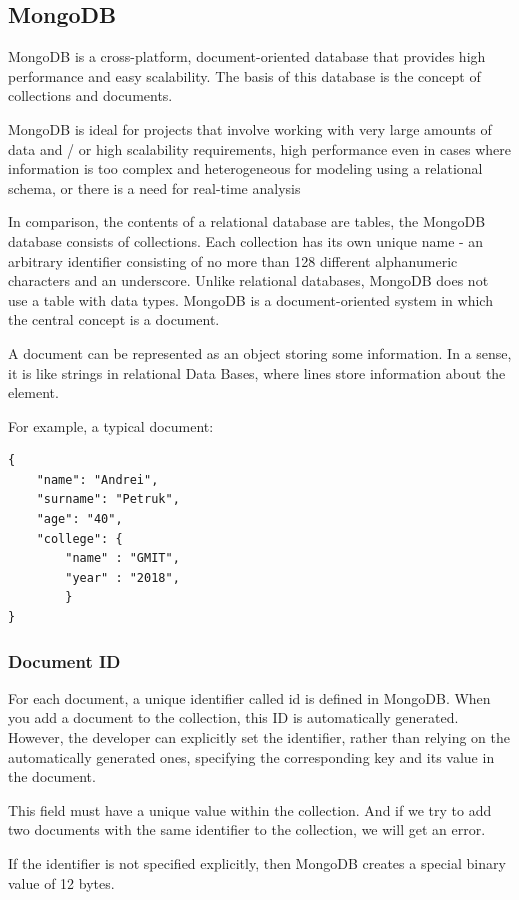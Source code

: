 \subsection{MongoDB}
MongoDB is a cross-platform, document-oriented database that provides high performance and easy scalability. The basis of this database is the concept of collections and documents.\par
MongoDB is ideal for projects that involve working with very large amounts of data and / or high scalability requirements, high performance even in cases where information is too complex and heterogeneous for modeling using a relational schema, or there is a need for real-time analysis \par
In comparison, the contents of a relational database are tables, the MongoDB database consists of collections. Each collection has its own unique name - an arbitrary identifier consisting of no more than 128 different alphanumeric characters and an underscore.
Unlike relational databases, MongoDB does not use a table with data types. MongoDB is a document-oriented system in which the central concept is a document. \par
A document can be represented as an object storing some information. In a sense, it is like strings in relational Data Bases, where lines store information about the element. \cite{MongoDB} \par For example, a typical document:

\begin{verbatim}
{
    "name": "Andrei",
    "surname": "Petruk",
    "age": "40",
    "college": {
        "name" : "GMIT",
        "year" : "2018",
        }
}
\end{verbatim}

\subsubsection{Document ID}
For each document, a unique identifier called id is defined in MongoDB. When you add a document to the collection, this ID is automatically generated. However, the developer can explicitly set the identifier, rather than relying on the automatically generated ones, specifying the corresponding key and its value in the document.\par
This field must have a unique value within the collection. And if we try to add two documents with the same identifier to the collection, we will get an error.\par
If the identifier is not specified explicitly, then MongoDB creates a special binary value of 12 bytes.\cite{MongoDBID}

